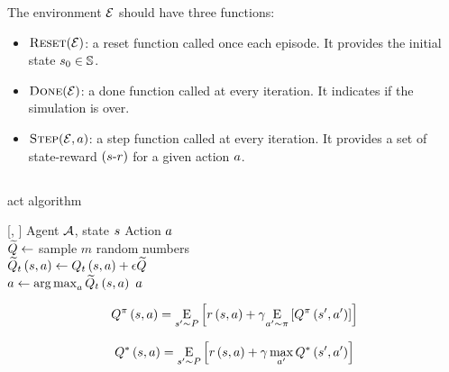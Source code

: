 \documentclass[conference]{IEEEtran}
\begin{document}
The environment $\mathcal{E}$ should have three functions:

\begin{itemize}
    \item $\textsc{Reset}(\mathcal{E})$: a reset function called once each episode. It provides the initial state $s_0 \in \mathbb{S}$.
    \item $\textsc{Done}(\mathcal{E})$: a done function called at every iteration. It indicates if the simulation is over.
    \item $\textsc{Step}(\mathcal{E}, a)$: a step function called at every iteration. It provides a set of state-reward $(s\textrm{-}r)$ for a given action $a$.
\end{itemize}


\subsection{\QAgent}\label{qagent}

\begin{algorithm}[ht]
    \caption{{\QAgent} act algorithm}
    \begin{algorithmic}[1]
        [\agent, \state]
        \INPUT      Agent $\mathcal{A}$, state $s$
        \OUTPUT     Action $a$
        \\[1.5pt]
        \STATE $ \Qrandom \gets $ sample $m$ random numbers \\[1.5pt]
        \STATE $ \QftargetNoisy \gets \Qftarget + \explorationrate \Qrandom $ \\[1.5pt]
        \STATE $ \action \gets \argmax_{\action}{\QftargetNoisy} $
        \RETURN $a$
    \end{algorithmic}
    \label{act}
\end{algorithm}


\begin{equation}
\Qfpolicy = \Expected[\nextstate \sim P]{\rewardf + \discountfactor \Expected[\nextaction \sim \policy]{\nextQfpolicy}}
\label{bellman}
\end{equation}

\begin{equation}
\Qfoptimal = \Expected[\nextstate \sim P]{\rewardf + \discountfactor \max_{\nextaction}{\nextQfoptimal}}
\label{optimal bellman}
\end{equation}
\end{document}
